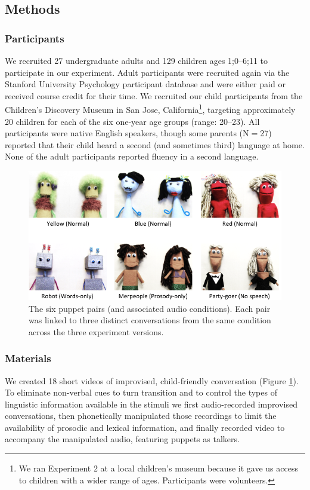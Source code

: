 \documentclass[authoryear, 12pt]{elsarticle}
\begin{document}
\subsection*{Methods}
\label{sec:methods2}

\subsubsection*{Participants}
We recruited 27 undergraduate adults and 129 children ages 1;0--6;11 to participate in our experiment. Adult participants were recruited again via the Stanford University Psychology participant database and were either paid or received course credit for their time. We recruited our child participants from the Children's Discovery Museum in San Jose, California\footnote{We ran Experiment 2 at a local children's museum because it gave us access to children with a wider range of ages. Participants were volunteers.}, targeting approximately 20 children for each of the six one-year age groups (range: 20--23). All participants were native English speakers, though some parents (N$=$27) reported that their child heard a second (and sometimes third) language at home. None of the adult participants reported fluency in a second language.

\begin{figure}[t]
\begin{center}
\includegraphics[width=\textwidth]{figures/FIG-EN-stim.png}
\end{center}
\caption{The six puppet pairs (and associated audio conditions). Each pair was linked to three distinct conversations from the same condition across the three experiment versions.}
\label{fig:puppets}
\end{figure}

\subsubsection*{Materials}
We created 18 short videos of improvised, child-friendly conversation (Figure \ref{fig:puppets}). To eliminate non-verbal cues to turn transition and to control the types of linguistic information available in the stimuli we first audio-recorded improvised conversations, then phonetically manipulated those recordings to limit the availability of prosodic and lexical information, and finally recorded video to accompany the manipulated audio, featuring puppets as talkers.
\end{document}

